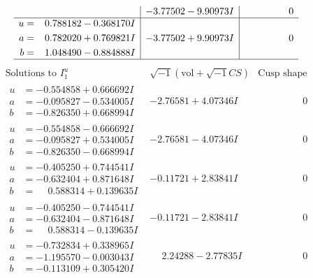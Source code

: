 \documentclass[1p]{elsarticle_modified}
\theoremstyle{definition}
\newcommand{\I}{\sqrt{-1}}
\begin{document}
$$\begin{array}{c|c|c}
 & -3.77502 - 9.90973 I & \phantom{-0.000000 } 0 \\ \hline\begin{aligned}
u &= \phantom{-}0.788182 - 0.368170 I \\
a &= \phantom{-}0.782020 + 0.769821 I \\
b &= \phantom{-}1.048490 - 0.884888 I\end{aligned}
 & -3.77502 + 9.90973 I & \phantom{-0.000000 } 0\\
 \hline 
 \end{array}$$\newpage$$\begin{array}{c|c|c}  
\text{Solutions to }I^u_{1}& \I (\text{vol} + \sqrt{-1}CS) & \text{Cusp shape}\\
 \hline 
\begin{aligned}
u &= -0.554858 + 0.666692 I \\
a &= -0.095827 - 0.534005 I \\
b &= -0.826350 + 0.668994 I\end{aligned}
 & -2.76581 + 4.07346 I & \phantom{-0.000000 } 0 \\ \hline\begin{aligned}
u &= -0.554858 - 0.666692 I \\
a &= -0.095827 + 0.534005 I \\
b &= -0.826350 - 0.668994 I\end{aligned}
 & -2.76581 - 4.07346 I & \phantom{-0.000000 } 0 \\ \hline\begin{aligned}
u &= -0.405250 + 0.744541 I \\
a &= -0.632404 + 0.871648 I \\
b &= \phantom{-}0.588314 + 0.139635 I\end{aligned}
 & -0.11721 + 2.83841 I & \phantom{-0.000000 } 0 \\ \hline\begin{aligned}
u &= -0.405250 - 0.744541 I \\
a &= -0.632404 - 0.871648 I \\
b &= \phantom{-}0.588314 - 0.139635 I\end{aligned}
 & -0.11721 - 2.83841 I & \phantom{-0.000000 } 0 \\ \hline\begin{aligned}
u &= -0.732834 + 0.338965 I \\
a &= -1.195570 - 0.003043 I \\
b &= -0.113109 + 0.305420 I\end{aligned}
 & \phantom{-}2.24288 - 2.77835 I & \phantom{-0.000000 } 0 \\ \hline\begin{aligned}

\end{aligned}
\end{array}$$
\end{document}
